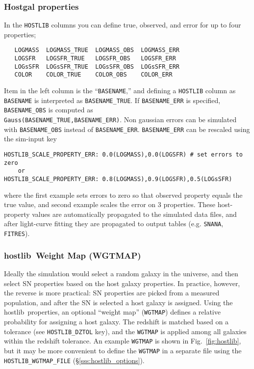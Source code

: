 \documentclass[12pt]{article}
\newcommand{\hostlib}{{\sc hostlib}}
\begin{document}
{\subsubsection{Hostgal properties}
\label{sss:hostgal_properties}
In the {\tt HOSTLIB} columns you can define true, observed, and error 
for up to four properties;
\begin{verbatim}
   LOGMASS  LOGMASS_TRUE  LOGMASS_OBS  LOGMASS_ERR 
   LOGSFR   LOGSFR_TRUE   LOGSFR_OBS   LOGSFR_ERR
   LOGsSFR  LOGsSFR_TRUE  LOGsSFR_OBS  LOGsSFR_ERR
   COLOR    COLOR_TRUE    COLOR_OBS    COLOR_ERR
\end{verbatim}
%
Item in the left column is the ``{\tt BASENAME},'' and defining a {\tt HOSTLIB}
column as {\tt BASENAME} is interpreted as {\tt BASENAME\_TRUE}.
If {\tt BASENAME\_ERR} is specified, {\tt BASENAME\_OBS} is computed as \\
%
{\tt Gauss(BASENAME\_TRUE,BASENAME\_ERR)}.
%
Non gaussian errors can be simulated with {\tt BASENAME\_OBS} 
instead of {\tt BASENAME\_ERR}.
{\tt BASENAME\_ERR} can be rescaled using the sim-input key 
\begin{verbatim}    
HOSTLIB_SCALE_PROPERTY_ERR: 0.0(LOGMASS),0.0(LOGSFR) # set errors to zero
    or
HOSTLIB_SCALE_PROPERTY_ERR: 0.8(LOGMASS),0.9(LOGSFR),0.5(LOGsSFR)  
\end{verbatim}
%
where the first example sets errors to zero so that observed property 
equals the true value, and second example scales the error on 3 properties.
%
These host-property values are automatically propagated to the simulated data 
files, and after light-curve fitting they are propagated to output tables 
(e.g. {\tt SNANA}, {\tt FITRES}).



\subsubsection{\hostlib\ Weight Map (WGTMAP)}
\label{sss:hostlib_wgtmap}

Ideally the simulation would select a random galaxy in the universe,
and then select SN properties based on the host galaxy properties.
In practice, however, the reverse is more practical: SN properties 
are picked from a measured population, and after the SN is selected
a host galaxy is assigned.
Using the \hostlib\ properties, an optional ``weight map'' ({\tt WGTMAP}) 
defines a relative probability for assigning a host galaxy. 
The redshift is matched based on a tolerance
(see {\tt HOSTLIB\_DZTOL} key), and the {\tt WGTMAP} is applied among
all galaxies within the redshift tolerance.
An example {\tt WGTMAP} is shown in Fig.~\ref{fig:hostlib}, but it may be
more convenient to define the {\tt WGTMAP} in a separate file using the
{\tt HOSTLIB\_WGTMAP\_FILE} (\S\ref{sss:hostlib_options}).

}
\end{document}
